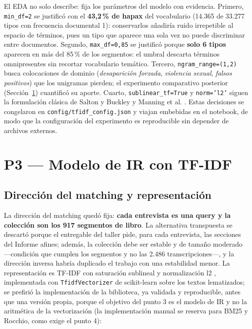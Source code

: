 \documentclass[11pt]{tg_usta}
\begin{document}
El EDA no solo describe: fija los parámetros del modelo con evidencia. Primero, \texttt{min\_df=2} se justificó con el \textbf{43,2\,\% de hapax} del vocabulario (14.365 de 33.277 tipos con frecuencia documental 1): conservarlos añadiría ruido irrepetible al espacio de términos, pues un tipo que aparece una sola vez no puede discriminar entre documentos. Segundo, \texttt{max\_df=0,85} se justificó porque \textbf{solo 6 tipos} aparecen en más del 85\,\% de los segmentos: el umbral descarta términos omnipresentes sin recortar vocabulario temático. Tercero, \texttt{ngram\_range=(1,2)} busca colocaciones de dominio (\textit{desaparición forzada}, \textit{violencia sexual}, \textit{falsos positivos}) que los unigramas pierden; el experimento comparativo posterior (Sección~\ref{sec:p3}) cuantificó su aporte. Cuarto, \texttt{sublinear\_tf=True} y \texttt{norm='l2'} siguen la formulación clásica de Salton y Buckley \cite{salton1988term} y Manning et al. \cite{manning2008introduction}. Estas decisiones se congelaron en \texttt{config/tfidf\_config.json} y viajan embebidas en el notebook, de modo que la configuración del experimento es reproducible sin depender de archivos externos.


\section{P3 --- Modelo de IR con TF-IDF}\label{sec:p3}

\subsection{Dirección del matching y representación}

La dirección del matching quedó fija: \textbf{cada entrevista es una query y la colección son los 917 segmentos de libro}. La alternativa transpuesta se descartó porque el entregable del taller pide, para cada entrevista, las secciones del Informe afines; además, la colección debe ser estable y de tamaño moderado ---condición que cumplen los segmentos y no las 2.486 transcripciones---, y la dirección inversa habría duplicado el trabajo con una estabilidad menor. La representación es TF-IDF con saturación sublineal y normalización l2 \cite{salton1988term,manning2008introduction}, implementada con \texttt{TfidfVectorizer} de scikit-learn \cite{scikit2024tfidf} sobre los textos lematizados; se prefirió la implementación de la biblioteca, ya validada y reproducible, antes que una versión propia, porque el objetivo del punto 3 es el modelo de IR y no la aritmética de la vectorización (la implementación manual se reserva para BM25 y Rocchio, como exige el punto 4):
\end{document}
